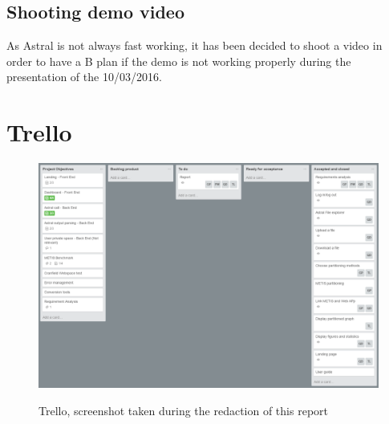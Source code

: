 \documentclass{cranfieldChart}
\begin{document}
\subsection*{Shooting demo video}
As Astral is not always fast working, it has been decided to shoot a video in order to have a B plan if the demo is not working properly during the presentation of the 10/03/2016.

\newpage
\section{Trello}

\begin{figure}[h!]
\centering
\includegraphics[width=1\textwidth]{ressources/trello}
\label{trello}
\caption{Trello, screenshot taken during the redaction of this report}
\end{figure}
\end{document}
